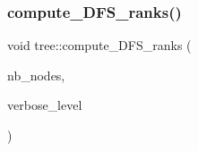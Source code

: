 \subsubsection{\texorpdfstring{compute\+\_\+\+D\+F\+S\+\_\+ranks()}{compute\_DFS\_ranks()}}
{\footnotesize\ttfamily void tree\+::compute\+\_\+\+D\+F\+S\+\_\+ranks (\begin{DoxyParamCaption}\item[{\mbox{\hyperlink{galois_8h_a09fddde158a3a20bd2dcadb609de11dc}{I\+NT}} \&}]{nb\+\_\+nodes,  }\item[{\mbox{\hyperlink{galois_8h_a09fddde158a3a20bd2dcadb609de11dc}{I\+NT}}}]{verbose\+\_\+level }\end{DoxyParamCaption})}

\mbox{\label{classtree_acfd7967aacb5c1e3faa2ad39b019dd68}} 
